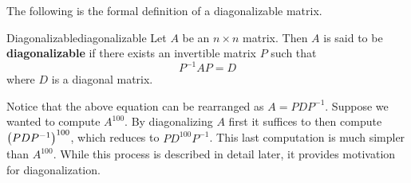 The following is the formal definition of a diagonalizable matrix. 

\begin{definition}{Diagonalizable}{diagonalizable}
Let $A$ be an $n\times n$ matrix. Then $A$ is said to be \textbf{diagonalizable} if there exists an invertible matrix $P$ such that
\begin{equation*}
P^{-1}AP=D
\end{equation*}
where $D$ is a diagonal matrix.
\end{definition}

Notice that the above equation can be rearranged as $A=PDP^{-1}$. Suppose we wanted to compute $A^{100}$. By diagonalizing $A$ first it suffices to then compute $\left(PDP^{-1}\right)^{100}$, which reduces to $PD^{100}P^{-1}$. This last computation is much simpler than $A^{100}$. While this process is described in detail later, it provides motivation for diagonalization. 
